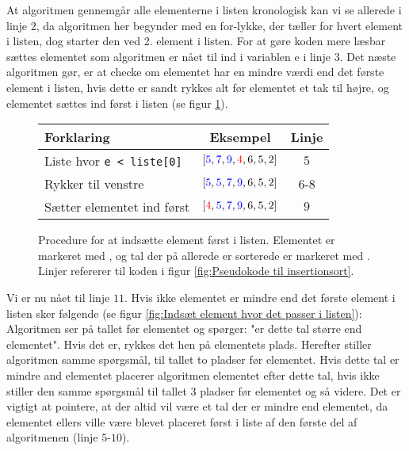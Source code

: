 At algoritmen gennemgår alle elementerne i listen kronologisk kan vi se allerede i linje 2, da algoritmen her begynder med en for-lykke, der tæller for hvert element i listen, dog starter den ved 2. element i listen. For at gøre koden mere læsbar sættes elementet som algoritmen er nået til ind i variablen e i linje 3. Det næste algoritmen gør, er at checke om elementet har en mindre værdi end det første element i listen, hvis dette er sandt rykkes alt før elementet et tak til højre, og elementet sættes ind først i listen (se figur \ref{fig:Indsæt element først i listen}).

\begin{figure}[h]
	\begin{center}
		\padtable
		\begin{tabular}{l|c|c}
			Forklaring & Eksempel & Linje \\
			\hline
			Liste hvor \verb|e < liste[0]| & $[\color{blue}5\color{black},\color{blue}7\color{black},\color{blue}9\color{black},\color{red}4\color{black},6,5,2]$ & $5$ \\
			Rykker til venstre & $[\color{blue}5\color{black},\color{blue}5\color{black},\color{blue}7\color{black},\color{blue}9\color{black},6,5,2]$ & $6$-$8$\\
			Sætter elementet ind først  & $[\color{red}4\color{black},\color{blue}5\color{black},\color{blue}7\color{black},\color{blue}9\color{black},6,5,2]$ & $9$
		\end{tabular}
	\end{center}
	\vspace{-3mm}
	\caption{Procedure for at indsætte element først i listen. Elementet er markeret med , og tal der på allerede er sorterede er markeret med . Linjer refererer til koden i figur \ref{fig:Pseudokode til insertionsort}.}
	\label{fig:Indsæt element først i listen}
\end{figure}


Vi er nu nået til linje $11$. Hvis ikke elementet er mindre end det første element i listen sker følgende (se figur \ref{fig:Indsæt element hvor det passer i listen}): Algoritmen ser på tallet før elementet og spørger: "er dette tal større end elementet". Hvis det er, rykkes det hen på elementets plads. Herefter stiller algoritmen samme spørgsmål, til tallet to pladser før elementet. Hvis dette tal er mindre and elementet placerer algoritmen elementet efter dette tal, hvis ikke stiller den samme spørgsmål til tallet 3 pladser før elementet og så videre. Det er vigtigt at pointere, at der altid vil være et tal der er mindre end elementet, da elementet ellers ville være blevet placeret først i liste af den første del af algoritmenen (linje $5$-$10$).


